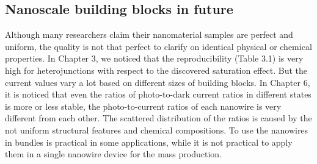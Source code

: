 




\subsection{Nanoscale building blocks in future}
Although many researchers claim their nanomaterial samples are perfect and uniform, the quality is not that perfect to clarify on identical physical or chemical properties. 
In Chapter 3, we noticed that the reproducibility (Table 3.1) is very high for heterojunctions with respect to the discovered saturation effect. 
But the current values vary a lot based on different sizes of building blocks. 
In Chapter 6, it is noticed that even the ratios of photo-to-dark current ratios in different states is more or less stable, the photo-to-current ratios of each nanowire is very different from each other. 
The scattered distribution of the ratios is caused by the not uniform structural features and chemical compositions. 
To use the nanowires in bundles is practical in some applications, while it is not practical to apply them in a single nanowire device for the mass production. \\

